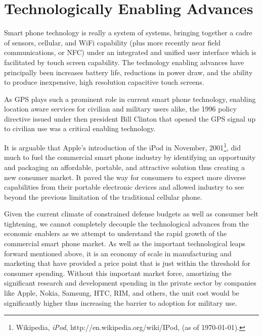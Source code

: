 \documentclass[letterpaper,12pt]{article}
\begin{document}
\section*{Technologically Enabling Advances}
Smart phone technology is really a system of systems, bringing together a cadre of sensors, cellular, and WiFi capability (plus more recently near field communications, or NFC) under an integrated and unified user interface which is facilitated by touch screen capability.  The technology enabling advances have principally been increases battery life, reductions in power draw, and the ability to produce inexpensive, high resolution capacitive touch screens.

As GPS plays such a prominent role in current smart phone technology, enabling location aware services for civilian and military users alike, the 1996 policy directive issued under then president Bill Clinton that opened the GPS signal up to civilian use was a critical enabling technology.

It is arguable that Apple's introduction of the iPod in November, 2001\footnote{Wikipedia, \emph{iPod}, http://en.wikipedia.org/wiki/IPod, (as of \today).}, did much to fuel the commercial smart phone industry by identifying an opportunity and packaging an affordable, portable, and attractive solution thus creating a new consumer market.  It paved the way for consumers to expect more diverse capabilities from their portable electronic devices and allowed industry to see beyond the previous limitation of the traditional cellular phone.

Given the current climate of constrained defense budgets as well as consumer belt tightening, we cannot completely decouple the technological advances from the economic enablers as we attempt to understand the rapid growth of the commercial smart phone market.  As well as the important technological leaps forward mentioned above, it is an economy of scale in manufacturing and marketing that have provided a price point that is just within the threshold for consumer spending.  Without this important market force, amortizing the significant research and development spending in the private sector by companies like Apple, Nokia, Samsung, HTC, RIM, and others, the unit cost would be significantly higher thus increasing the barrier to adoption for military use.
\end{document}
